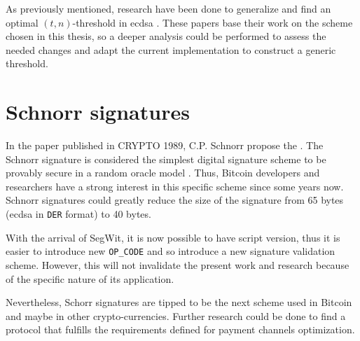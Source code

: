 As previously mentioned, research have been done to generalize and find an
optimal $(t, n)$-threshold in \gls{ecdsa} \cite{10.1007/BFb0052253,
10.1007/978-3-642-27954-6_20}. These papers base their work on the scheme chosen
in this thesis, so a deeper analysis could be performed to assess the
needed changes and adapt the current implementation to construct a generic threshold.

\section{Schnorr signatures}

In the paper 
published in CRYPTO 1989, C.P. Schnorr propose the  \cite{10.1007/0-387-34805-0_22}. The Schnorr signature is considered
the simplest digital signature scheme to be provably secure in a random oracle
model \cite{Bellare:1993:ROP:168588.168596, 10.1007/978-3-642-29011-4_33}. Thus,
Bitcoin developers and researchers have a strong interest in this specific
scheme since some years now. Schnorr signatures could greatly reduce the size of
the signature from 65 bytes (\gls{ecdsa} in \texttt{DER} format) to 40 bytes.

With the arrival of SegWit, it is now possible to have script version, thus it
is easier to introduce new \texttt{OP\_CODE} and so introduce a new signature
validation scheme. However, this will not invalidate the present work and
research because of the specific nature of its application.

Nevertheless, Schorr signatures are tipped to be the next scheme used in Bitcoin
and maybe in other crypto-currencies. Further research could be done to find a
protocol that fulfills the requirements defined for payment channels
optimization.
